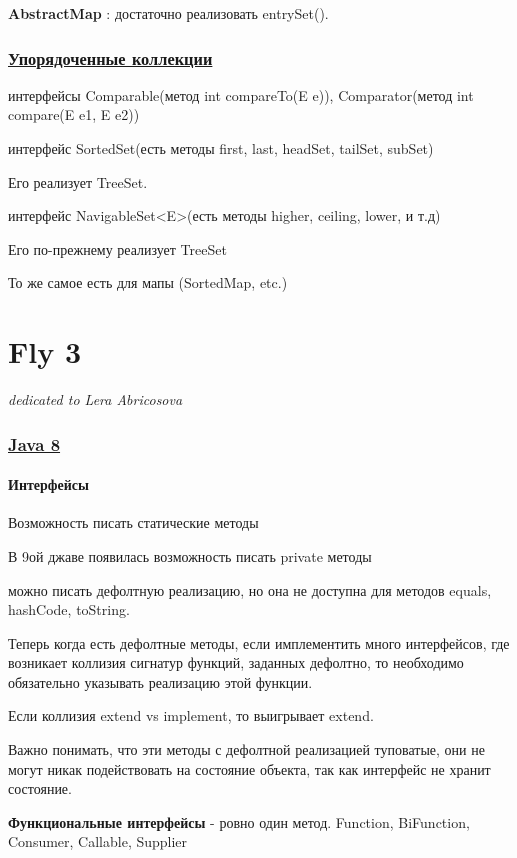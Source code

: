 \documentclass{article}
\begin{document}
\textbf{AbstractMap} : достаточно реализовать entrySet().

\section{\underline{Упорядоченные коллекции}}

интерфейсы Comparable(метод int compareTo(E e)), Comparator(метод int compare(E e1, E e2))

интерфейс SortedSet(есть методы first, last, headSet, tailSet, subSet)

Его реализует TreeSet.

интерфейс NavigableSet<E>(есть методы higher, ceiling, lower, и т.д)

Его по-прежнему реализует TreeSet

То же самое есть для мапы (SortedMap, etc.)

\newpage

\part{Fly 3}

\textit{dedicated to Lera Abricosova}

\section{\underline{Java 8}}

\subsection{Интерфейсы}

Возможность писать статические методы

В 9ой джаве появилась возможность писать private методы

можно писать дефолтную реализацию, но она не доступна для методов equals, hashCode, toString.

Теперь когда есть дефолтные методы, если имплементить много интерфейсов, где возникает коллизия сигнатур функций, заданных дефолтно, то необходимо обязательно указывать реализацию этой функции.

Если коллизия extend vs implement, то выигрывает extend.

Важно понимать, что эти методы с дефолтной реализацией туповатые, они не могут никак подействовать на состояние объекта, так как интерфейс не хранит состояние.

\textbf{Функциональные интерфейсы} - ровно один метод. Function, BiFunction, Consumer, Callable, Supplier
\end{document}
